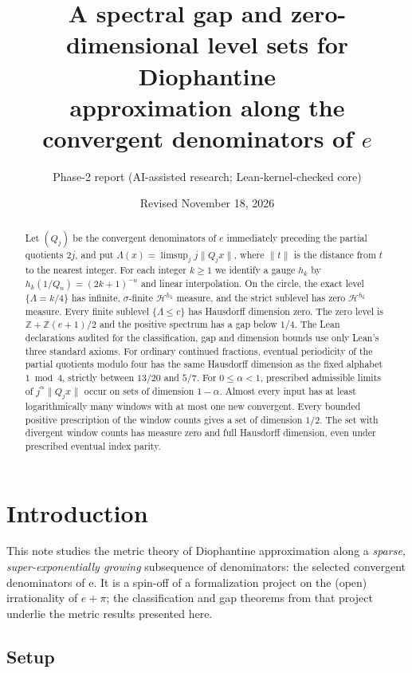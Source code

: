 \documentclass[11pt]{article}
\title{A spectral gap and zero-dimensional level sets for Diophantine\\
approximation along the convergent denominators of \texorpdfstring{$e$}{e}}
\author{Phase-2 report (AI-assisted research; Lean-kernel-checked core)}
\date{Revised November 18, 2026}
\theoremstyle{definition}
\theoremstyle{remark}
\newcommand{\ee}{\mathrm{e}}
\begin{document}
\maketitle

\begin{abstract}
Let $(Q_j)$ be the convergent denominators of $e$ immediately preceding
the partial quotients $2j$, and put $\Lambda(x)=\limsup_j j\|Q_jx\|$,
where $\|t\|$ is the distance from $t$ to the nearest integer.
For each integer $k\ge1$ we identify a gauge $h_k$ by
$h_k(1/Q_n)=(2k+1)^{-n}$ and linear interpolation. On the circle,
the exact level $\{\Lambda=k/4\}$ has infinite, $\sigma$-finite
$\mathcal H^{h_k}$ measure, and the strict sublevel has zero
$\mathcal H^{h_k}$ measure. Every finite sublevel
$\{\Lambda\le c\}$ has Hausdorff dimension zero. The zero level is
$\mathbb Z+\mathbb Z(e+1)/2$ and the positive spectrum has a gap
below $1/4$. The Lean declarations audited for the classification,
gap and dimension bounds use only Lean's three standard axioms.
For ordinary continued fractions, eventual periodicity of the
partial quotients modulo four has the same Hausdorff dimension
as the fixed alphabet $1\bmod 4$, strictly between $13/20$ and $5/7$.
For $0\le\alpha<1$, prescribed admissible limits of
$j^\alpha\|Q_jx\|$ occur on sets of dimension $1-\alpha$.
Almost every input has at least logarithmically many windows with
at most one new convergent.
Every bounded positive prescription of the window counts gives
a set of dimension $1/2$.
The set with divergent window counts has measure zero and full
Hausdorff dimension, even under prescribed eventual index parity.
\end{abstract}

\section{Introduction}

This note studies the metric theory of Diophantine approximation along a
\emph{sparse, super-exponentially growing} subsequence of denominators: the
selected convergent denominators of $\ee$. It is a spin-off of a formalization
project on the (open) irrationality of $e+\pi$; the classification and gap
theorems from that project underlie the metric results presented here.

\subsection{Setup}
\end{document}
